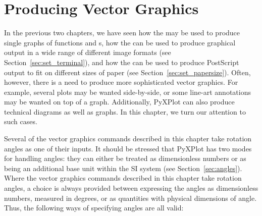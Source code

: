 %
%
%
%
%



\chapter{Producing Vector Graphics}
\label{ch:vector_graphics}

In the previous two chapters, we have seen how the  may be used
to produce single graphs of functions and \datafile s, how the  can be used to produce graphical output in a wide range of different
image formats (see Section~\ref{sec:set_terminal}), and how the  can be used to produce PostScript output to fit on different sizes
of paper (see Section~\ref{sec:set_papersize}). Often, however, there is a need
to produce more sophisticated vector graphics.  For example, several plots may
be wanted side-by-side, or some line-art annotations may be wanted on top of a
graph. Additionally, PyXPlot can also produce technical diagrams as well as
graphs. In this chapter, we turn our attention to such cases.

Several of the vector graphics commands described in this chapter take rotation
angles as one of their inputs.  It should be stressed that PyXPlot has two
modes for handling angles: they can either be treated as dimensionless numbers
or as being an additional base unit within the SI system (see
Section~\ref{sec:angles}).  Where the vector graphics commands described in
this chapter take rotation angles, a choice is always provided between
expressing the angles as dimensionless numbers, measured in degrees, or as
quantities with physical dimensions of angle. Thus, the following ways of
specifying angles are all valid:

